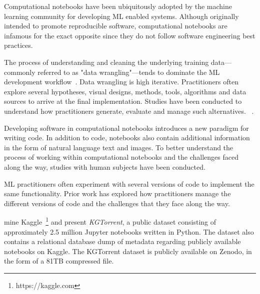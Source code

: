 \documentclass[acmsmall,screen,review,anonymous]{acmart}
\begin{document}

Computational notebooks have been ubiquitously adopted by the machine learning community for developing ML enabled systems. Although originally intended to promote reproducible software, computational notebooks are infamous for the exact opposite since they do not follow software engineering best practices.

The process of understanding and cleaning the underlying training data---commonly referred to as "data wrangling"---tends to dominate the ML development workflow~\cite{CITME}. Data wrangling is high iterative. Practitioners often explore several hypotheses, visual designs, methods, tools, algorithms and data sources to arrive at the final implementation. Studies have been conducted to understand how practitioners generate, evaluate and manage such alternatives. ~\cite{liu2019understanding,kandel2012enterprise}.

Developing software in computational notebooks introduces a new paradigm for writing code. In addition to code, notebooks also contain additional information in the form of natural language text and images. To better understand the process of working within computational notebooks and the challenges faced along the way, studies with human subjects have been conducted\cite{head2019managing}.


 ML practitioners often experiment with several versions of code to implement the same functionality. Prior work has explored how practitioners manage the different versions of code and the challenges that they face along the way.

\citeauthor{quaranta2021kgtorrent} mine Kaggle~\footnote{https://kaggle.com} and present \textit{KGTorrent}, a public dataset consisting of approximately 2.5 million Jupyter notebooks written in Python. The dataset also contains a relational database dump of metadata regarding publicly available notebooks on Kaggle. The KGTorrent dataset is publicly available on Zenodo, in the form of a 81TB compressed file.


\end{document}
